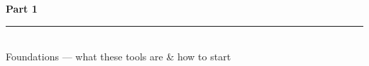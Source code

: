 \documentclass[aspectratio=169, 10pt]{beamer}
\begin{document}

{
\begin{frame}
\centering\vfill
{\fontsize{22}{28}\bfseries\selectfont\color{white} Part 1}\\[6pt]
{\color{UVMGold}\rule{5cm}{0.8pt}}\\[6pt]
{\normalsize\color{UVMGold} Foundations --- what these tools are \& how to start}
\vfill
\end{frame}
}
\end{document}

